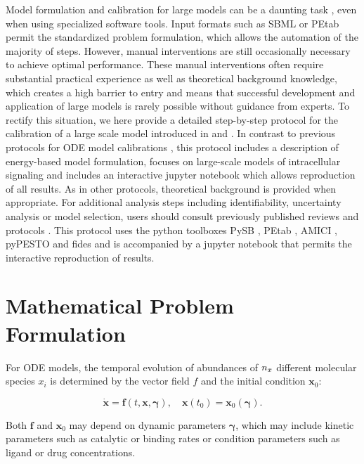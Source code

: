 \documentclass[11pt]{article}
\begin{document}
    Model formulation and calibration for large models can be a daunting
task \cite{2754712/C7C8DJNE}, even when using specialized software
tools. Input formats such as SBML or PEtab \cite{2754712/86CV69R2}
permit the standardized problem formulation, which allows the automation
of the majority of steps. However, manual interventions are still
occasionally necessary to achieve optimal performance. These manual
interventions often require substantial practical experience as well as
theoretical background knowledge, which creates a high barrier to entry
and means that successful development and application of large models is
rarely possible without guidance from experts. To rectify this
situation, we here provide a detailed step-by-step protocol for the
calibration of a large scale model introduced in \cite{2754712/I4JQ4DMV}
and \cite{2754712/Y3E9IYH8}. In contrast to previous protocols for ODE
model calibrations \cite{2754712/3DK88XY2}, this protocol includes a
description of energy-based model formulation, focuses on large-scale
models of intracellular signaling and includes an interactive jupyter
notebook which allows reproduction of all results. As in other
protocols, theoretical background is provided when appropriate. For
additional analysis steps including identifiability, uncertainty
analysis or model selection, users should consult previously published
reviews and protocols . This protocol uses the python toolboxes PySB ,
PEtab , AMICI , pyPESTO and fides and is accompanied by a jupyter
notebook that permits the interactive reproduction of results.

    \hypertarget{mathematical-problem-formulation}{%
\section{Mathematical Problem
Formulation}\label{mathematical-problem-formulation}}

    \(\newcommand{\dims}[1]{{n_{#1}}}\)For ODE models, the temporal
evolution of abundances of \(\dims{x}\) different molecular species
\(x_i\) is determined by the vector field \(f\) and the initial
condition \(\textbf{x}_0\):

\begin{equation}
\dot{\textbf{x}}=\textbf{f}(t,\textbf{x},\boldsymbol{\gamma}),\quad \textbf{x}(t_0) = \textbf{x}_0(\boldsymbol{\gamma}).
\label{eq:ode}
\end{equation}

Both \(\textbf{f}\) and \(\textbf{x}_0\) may depend on dynamic
parameters \(\boldsymbol{\gamma}\), which may include kinetic parameters
such as catalytic or binding rates or condition parameters such as
ligand or drug concentrations.
\end{document}
